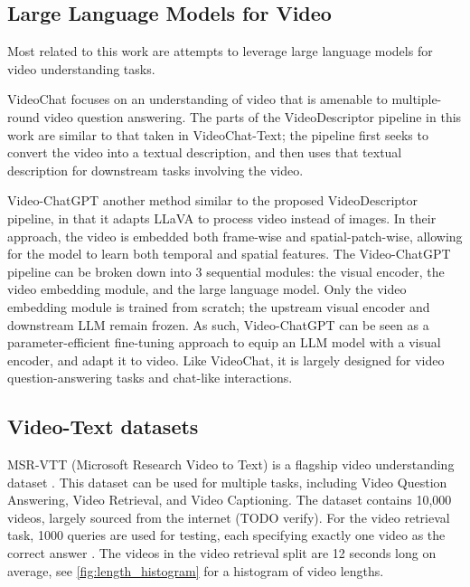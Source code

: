 \subsection{Large Language Models for Video}

Most related to this work are attempts to leverage large language models for video understanding tasks.

VideoChat \cite{videochat} focuses on an understanding of video that is amenable to multiple-round video question answering.
The parts of the VideoDescriptor pipeline  in this work are similar to that taken in VideoChat-Text; 
the pipeline first seeks to convert the video into a textual description, and then uses that textual description for downstream tasks involving the video.

Video-ChatGPT \cite{videochatgpt} another method similar to the proposed VideoDescriptor pipeline, in that it adapts LLaVA to process video instead of images.
In their approach, the video is embedded both frame-wise and spatial-patch-wise, allowing for the model to learn both temporal and spatial features.
The Video-ChatGPT pipeline can be broken down into 3 sequential modules: the visual encoder, the video embedding module, and the large language model.
Only the video embedding module is trained from scratch; the upstream visual encoder and downstream LLM remain frozen.
As such, Video-ChatGPT can be seen as a parameter-efficient fine-tuning approach to equip an LLM model with a visual encoder, and adapt it to video.
Like VideoChat, it is largely designed for video question-answering tasks and chat-like interactions.


\subsection{Video-Text datasets}
MSR-VTT (Microsoft Research Video to Text) is a flagship video understanding dataset \cite{msr-vtt}.
This dataset can be used for multiple tasks, including Video Question Answering, Video Retrieval, and Video Captioning.
The dataset contains 10,000 videos, largely sourced from the internet (TODO verify).
For the video retrieval task, 1000 queries are used for testing, each specifying exactly one video as the correct answer \cite{jsfusion}.
The videos in the video retrieval split are 12 seconds long on average, see \ref{fig:length_histogram} for a histogram of video lengths.

